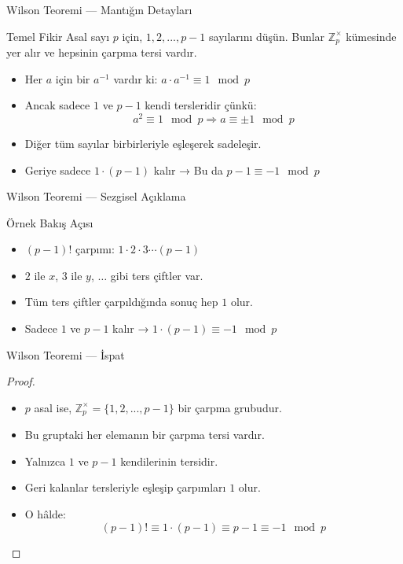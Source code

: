 \documentclass{beamer}
\begin{document}
\begin{frame}{Wilson Teoremi — Mantığın Detayları}
  \begin{block}{Temel Fikir}
    Asal sayı $p$ için, $1, 2, ..., p-1$ sayılarını düşün. Bunlar $\mathbb{Z}_p^\times$ kümesinde yer alır ve hepsinin çarpma tersi vardır.
  \end{block}
  
  \begin{itemize}
    \item Her $a$ için bir $a^{-1}$ vardır ki: $a \cdot a^{-1} \equiv 1 \mod p$
    \item Ancak sadece $1$ ve $p-1$ kendi tersleridir çünkü:
    \[
    a^2 \equiv 1 \mod p \Rightarrow a \equiv \pm 1 \mod p
    \]
    \item Diğer tüm sayılar birbirleriyle eşleşerek sadeleşir.
    \item Geriye sadece $1 \cdot (p-1)$ kalır → Bu da $p-1 \equiv -1 \mod p$
  \end{itemize}
\end{frame}

\begin{frame}{Wilson Teoremi — Sezgisel Açıklama}
  \begin{exampleblock}{Örnek Bakış Açısı}
    \begin{itemize}
      \item $(p-1)!$ çarpımı: $1 \cdot 2 \cdot 3 \cdots (p-1)$
      \item $2$ ile $x$, $3$ ile $y$, $\dots$ gibi ters çiftler var.
      \item Tüm ters çiftler çarpıldığında sonuç hep $1$ olur.
      \item Sadece $1$ ve $p-1$ kalır → $1 \cdot (p-1) \equiv -1 \mod p$
    \end{itemize}
  \end{exampleblock}
\end{frame}

\begin{frame}{Wilson Teoremi — İspat}
  \begin{proof}
    \begin{itemize}
      \item $p$ asal ise, $\mathbb{Z}_p^\times = \{1, 2, ..., p-1\}$ bir çarpma grubudur.
      \item Bu gruptaki her elemanın bir çarpma tersi vardır.
      \item Yalnızca $1$ ve $p - 1$ kendilerinin tersidir.
      \item Geri kalanlar tersleriyle eşleşip çarpımları $1$ olur.
      \item O hâlde:
      \[
      (p - 1)! \equiv 1 \cdot (p - 1) \equiv p - 1 \equiv -1 \mod p
      \]
    \end{itemize}
  \end{proof}
\end{frame}
\end{document}

